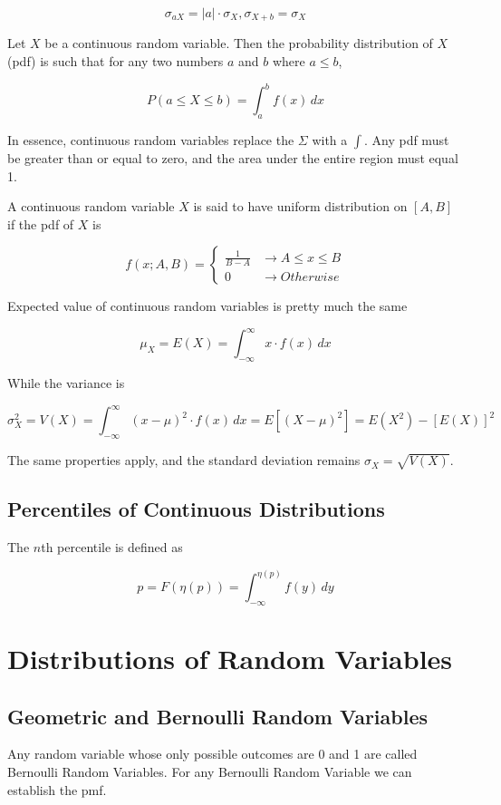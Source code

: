         \[ \sigma_{aX} = |a| \cdot \sigma_X, \sigma_{X+b} = \sigma_X \]

    Let $X$ be a continuous random variable. Then the probability distribution of $X$ (pdf) is such that for any two numbers $a$
    and $b$ where $a \le b$,

        \[ P(a \le X \le b) = \int^b_a f(x)\, dx \]

    In essence, continuous random variables replace the $\Sigma$ with a $\int$. Any pdf must be greater than or equal to
    zero, and the area under the entire region must equal 1.

    A continuous random variable $X$ is said to have uniform distribution on $[A, B]$ if the pdf of $X$ is

    \[
        f(x;A, B) =
        \begin{cases}
            \frac{1}{B-A} &\to A \le x \le B\\
            0 &\to Otherwise
        \end{cases}
    \]

    Expected value of continuous random variables is pretty much the same

        \[ \mu_X = E(X) = \int^\infty_{-\infty} x \cdot f(x) \, dx \]

    While the variance is

        \[ \sigma^2_X = V(X) = \int^\infty_{-\infty} {(x - \mu)}^2 \cdot f(x) \, dx = E[(X-\mu)^2] = E(X^2) - [E(X)]^2 \]

    The same properties apply, and the standard deviation remains $\sigma_X = \sqrt{V(X)}$.

    \subsection{Percentiles of Continuous Distributions}
    The $n$th percentile is defined as

        \[ p = F(\eta (p)) = \int^{\eta(p)}_{-\infty} f(y) \, dy \]

\section{Distributions of Random Variables}
    \subsection{Geometric and Bernoulli Random Variables}
    Any random variable whose only possible outcomes are 0 and 1 are called Bernoulli Random Variables. For any
    Bernoulli Random Variable we can establish the pmf.

